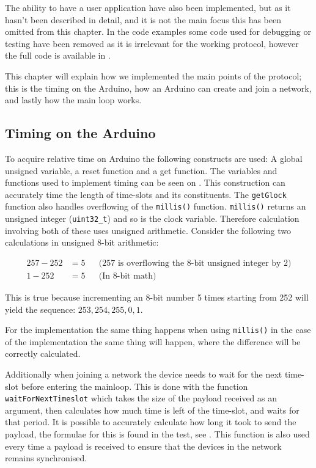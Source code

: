 \noindent
The ability to have a user application have also been implemented, but as it hasn't been described in detail, and it is not the main focus this has been omitted from this chapter.
In the code examples some code used for debugging or testing have been removed as it is irrelevant for the working protocol, however the full code is available in . 

This chapter will explain how we implemented the main points of the protocol; this is the timing on the Arduino, how an Arduino can create and join a network, and lastly how the main loop works. 

\subsection{Timing on the Arduino}
To acquire relative time on Arduino the following constructs are used: A global unsigned variable, a reset function and a get function.
The variables and functions used to implement timing can be seen on .
This construction can accurately time the length of time-slots and its constituents. 
The \texttt{getGlock} function also handles overflowing of the \texttt{millis()} function. 
\texttt{millis()} returns an unsigned integer (\texttt{uint32\_t}) and so is the clock variable.
Therefore calculation involving both of these uses unsigned arithmetic.
Consider the following two calculations in unsigned 8-bit arithmetic:

\begin{align*}
257 - 252   &= 5 && \text{(257 is overflowing the 8-bit unsigned integer by 2)} \\
1 - 252     &= 5 && \text{(In 8-bit math)}
\end{align*}

\noindent
This is true because incrementing an 8-bit number 5 times starting from 252 will yield the sequence: $253, 254, 255, 0, 1$. 

For the implementation the same thing happens when using \texttt{millis()} in the case of the implementation the same thing will happen, where the difference will be correctly calculated.

Additionally when joining a network the device needs to wait for the next time-slot before entering the mainloop. 
This is done with the function \texttt{waitForNextTimeslot} which takes the size of the payload received as an argument, then calculates how much time is left of the time-slot, and waits for that period. 
It is possible to accurately calculate how long it took to send the payload, the formulae for this is found in the test, see .
This function is also used every time a payload is received to ensure that the devices in the network remains synchronised. 

